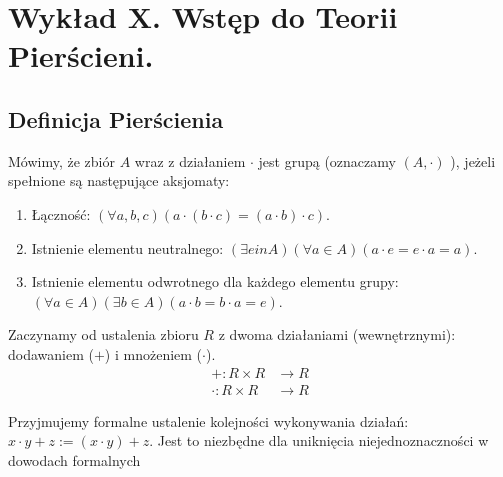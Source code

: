 \chapter{Wykład X. Wstęp do Teorii Pierścieni.}

\section{Definicja Pierścienia}

\begin{remark}
	Mówimy, że zbiór $A$ wraz z działaniem $\cdot $ jest grupą (oznaczamy $\left( A, \cdot  \right) $ ), jeżeli spełnione są następujące aksjomaty:
\begin{enumerate}[label=A\arabic*.]
	\item Łączność: $\left(\forall a,b,c \right)\left( a\cdot \left( b\cdot c \right) = \left( a\cdot b \right) \cdot c \right)  $.
	\item Istnienie elementu neutralnego: $\left(\exists e in A \right) \left(\forall a \in A \right)\left( a\cdot e = e\cdot a = a \right) $.
	\item Istnienie elementu odwrotnego dla każdego elementu grupy: $\left(\forall a \in A \right)\left(\exists b \in A \right)\left( a\cdot b= b\cdot a = e \right)$.
\end{enumerate}
\end{remark} 
Zaczynamy od ustalenia zbioru $R$ z dwoma działaniami (wewnętrznymi): dodawaniem ($+$) i mnożeniem ($\cdot$).
\begin{align*}
    +: R \times R &\to R \\
    \cdot: R \times R &\to R
\end{align*}
\begin{remark}
	Przyjmujemy formalne ustalenie kolejności wykonywania działań: $x \cdot y + z := (x \cdot y) + z$. Jest to niezbędne dla uniknięcia niejednoznaczności w dowodach formalnych
\end{remark} 

